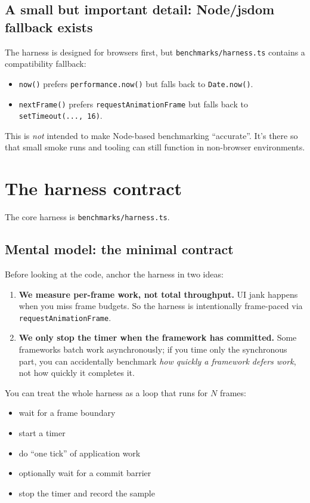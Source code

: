 \subsection{A small but important detail: Node/jsdom fallback exists}

The harness is designed for browsers first, but \texttt{benchmarks/harness.ts} contains a compatibility fallback:

\begin{itemize}
\item \texttt{now()} prefers \texttt{performance.now()} but falls back to \texttt{Date.now()}.
\item \texttt{nextFrame()} prefers \texttt{requestAnimationFrame} but falls back to \texttt{setTimeout(..., 16)}.
\end{itemize}

This is \emph{not} intended to make Node-based benchmarking ``accurate''. It's there so that small smoke runs and tooling can still function in non-browser environments.

\section{The harness contract}

The core harness is \texttt{benchmarks/harness.ts}.

\subsection{Mental model: the minimal contract}

Before looking at the code, anchor the harness in two ideas:

\begin{enumerate}
\item \textbf{We measure per-frame work, not total throughput.} UI jank happens when you miss frame budgets. So the harness is intentionally frame-paced via \texttt{requestAnimationFrame}.
\item \textbf{We only stop the timer when the framework has committed.} Some frameworks batch work asynchronously; if you time only the synchronous part, you can accidentally benchmark \emph{how quickly a framework defers work}, not how quickly it completes it.
\end{enumerate}

You can treat the whole harness as a loop that runs for \(N\) frames:

\begin{itemize}
\item wait for a frame boundary
\item start a timer
\item do ``one tick'' of application work
\item optionally wait for a commit barrier
\item stop the timer and record the sample
\end{itemize}

